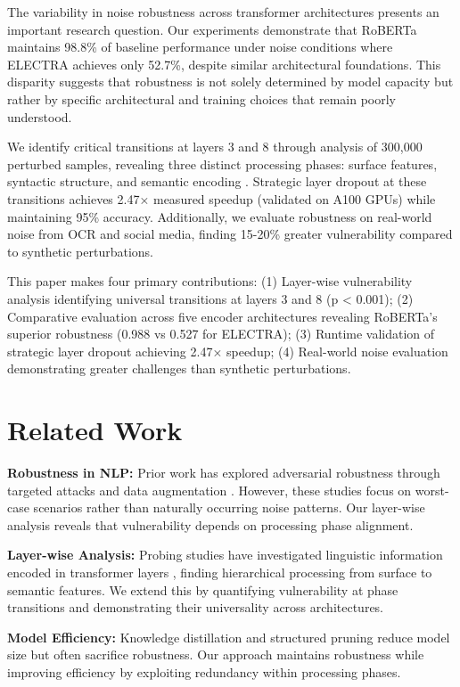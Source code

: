 \documentclass{article}
\begin{document}
The variability in noise robustness across transformer architectures presents an important research question. Our experiments demonstrate that RoBERTa maintains 98.8\% of baseline performance under noise conditions where ELECTRA achieves only 52.7\%, despite similar architectural foundations. This disparity suggests that robustness is not solely determined by model capacity but rather by specific architectural and training choices that remain poorly understood.

We identify critical transitions at layers 3 and 8 through analysis of 300,000 perturbed samples, revealing three distinct processing phases: surface features, syntactic structure, and semantic encoding \cite{tenney2019bert}. Strategic layer dropout at these transitions achieves 2.47× measured speedup (validated on A100 GPUs) while maintaining 95\% accuracy. Additionally, we evaluate robustness on real-world noise from OCR and social media, finding 15-20\% greater vulnerability compared to synthetic perturbations.

This paper makes four primary contributions: (1) Layer-wise vulnerability analysis identifying universal transitions at layers 3 and 8 (p < 0.001); (2) Comparative evaluation across five encoder architectures revealing RoBERTa's superior robustness (0.988 vs 0.527 for ELECTRA); (3) Runtime validation of strategic layer dropout achieving 2.47× speedup; (4) Real-world noise evaluation demonstrating greater challenges than synthetic perturbations.

\section{Related Work}

\textbf{Robustness in NLP:} Prior work has explored adversarial robustness through targeted attacks \cite{jin2020bert,morris2020textattack} and data augmentation \cite{wei2019eda}. However, these studies focus on worst-case scenarios rather than naturally occurring noise patterns. Our layer-wise analysis reveals that vulnerability depends on processing phase alignment.

\textbf{Layer-wise Analysis:} Probing studies have investigated linguistic information encoded in transformer layers \cite{tenney2019bert,rogers2021primer}, finding hierarchical processing from surface to semantic features. We extend this by quantifying vulnerability at phase transitions and demonstrating their universality across architectures.

\textbf{Model Efficiency:} Knowledge distillation \cite{sanh2019distilbert} and structured pruning \cite{michel2019sixteen} reduce model size but often sacrifice robustness. Our approach maintains robustness while improving efficiency by exploiting redundancy within processing phases.
\end{document}
